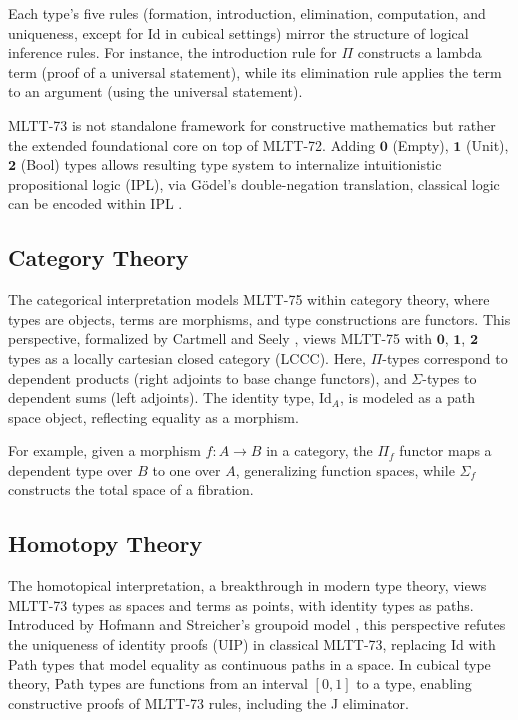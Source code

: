 \documentclass{article}
\theoremstyle{definition}
\begin{document}
Each type’s five rules (formation, introduction, elimination, computation,
and uniqueness, except for Id in cubical settings) mirror the structure
of logical inference rules. For instance, the introduction rule for $\Pi$
constructs a lambda term (proof of a universal statement), while its elimination
rule applies the term to an argument (using the universal statement).

MLTT-73 is not standalone framework for constructive mathematics
but rather the extended foundational core on top of MLTT-72.
Adding $\mathbf{0}$ (Empty), $\mathbf{1}$ (Unit), $\mathbf{2}$ (Bool) types allows
resulting type system to internalize intuitionistic propositional logic (IPL),
via Gödel’s double-negation translation, classical logic can be encoded within IPL \cite{Nordstrom90}.

\subsection{Category Theory}

The categorical interpretation models MLTT-75 within category theory,
where types are objects, terms are morphisms, and type constructions are functors.
This perspective, formalized by Cartmell and Seely \cite{Jacobs99},
views MLTT-75 with $\mathbf{0}$, $\mathbf{1}$, $\mathbf{2}$ types
as a locally cartesian closed category (LCCC). Here, $\Pi$-types
correspond to dependent products (right adjoints to base change functors),
and $\Sigma$-types to dependent sums (left adjoints). The identity
type, $\text{Id}_A$, is modeled as a path space object, reflecting
equality as a morphism.

For example, given a morphism $f : A \to B$ in a category, the $\Pi_f$
functor maps a dependent type over $B$ to one over $A$, generalizing
function spaces, while $\Sigma_f$ constructs the total space of a fibration.

\subsection{Homotopy Theory}

The homotopical interpretation, a breakthrough in modern type theory,
views MLTT-73 types as spaces and terms as points, with identity types as paths.
Introduced by Hofmann and Streicher’s groupoid model \cite{Hofmann96},
this perspective refutes the uniqueness of identity proofs (UIP) in
classical MLTT-73, replacing Id with Path types that model equality
as continuous paths in a space. In cubical type theory, Path types
are functions from an interval $[0,1]$ to a type, enabling constructive
proofs of MLTT-73 rules, including the J eliminator.
\end{document}
